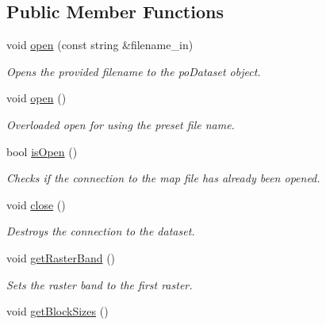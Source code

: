 \subsection*{Public Member Functions}
\begin{DoxyCompactItemize}
\item 
void \hyperlink{class_map_aa2764c9ae1c54c1821fa4f63b88fe0f3}{open} (const string \&filename\+\_\+in)
\begin{DoxyCompactList}\small\item\em Opens the provided filename to the po\+Dataset object. \end{DoxyCompactList}\item 
void \hyperlink{class_map_a2389e09950706ef49640976837186c79}{open} ()\hypertarget{class_map_a2389e09950706ef49640976837186c79}{}\label{class_map_a2389e09950706ef49640976837186c79}

\begin{DoxyCompactList}\small\item\em Overloaded open for using the preset file name. \end{DoxyCompactList}\item 
bool \hyperlink{class_map_a19f6874b008fcbfac213341d05c2f443}{is\+Open} ()
\begin{DoxyCompactList}\small\item\em Checks if the connection to the map file has already been opened. \end{DoxyCompactList}\item 
void \hyperlink{class_map_ad73fafd17ff95872e9b63945584ae81f}{close} ()\hypertarget{class_map_ad73fafd17ff95872e9b63945584ae81f}{}\label{class_map_ad73fafd17ff95872e9b63945584ae81f}

\begin{DoxyCompactList}\small\item\em Destroys the connection to the dataset. \end{DoxyCompactList}\item 
void \hyperlink{class_map_ade2338d7a8d598c343208b633f8a3a93}{get\+Raster\+Band} ()\hypertarget{class_map_ade2338d7a8d598c343208b633f8a3a93}{}\label{class_map_ade2338d7a8d598c343208b633f8a3a93}

\begin{DoxyCompactList}\small\item\em Sets the raster band to the first raster. \end{DoxyCompactList}\item 
void \hyperlink{class_map_a4e441dcda33d78bef193b1ad1265b5e8}{get\+Block\+Sizes} ()\hypertarget{class_map_a4e441dcda33d78bef193b1ad1265b5e8}{}\label{class_map_a4e441dcda33d78bef193b1ad1265b5e8}


\end{DoxyCompactItemize}
